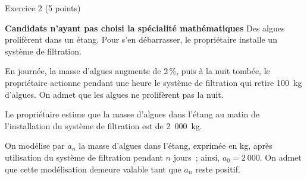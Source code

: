 
\begin{h2}Exercice 2 (5 points)\end{h2}
\textbf{Candidats n'ayant pas choisi la spécialité \og mathématiques \fg{}}
\medskip
Des algues prolifèrent dans un étang. Pour s'en débarrasser, le propriétaire installe
un système de filtration.
\par
En journée, la masse d'algues augmente de 2\,\%, puis à la nuit tombée, le propriétaire
actionne pendant une heure le système de filtration qui retire 1$00$~kg d'algues. On
admet que les algues ne prolifèrent pas la nuit.
\par
Le propriétaire estime que la masse d'algues dans l'étang au matin de l'installation
du système de filtration est de 2~000~kg.
\par
On modélise par $a_n$ la masse d'algues dans l'étang, exprimée en kg, après utilisation
du système de filtration pendant $n$ jours~; ainsi, $a_0 = 2~000$. On admet que cette
modélisation demeure valable tant que $a_n$ reste positif.
\bigskip

